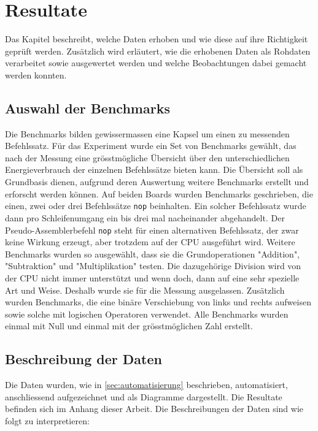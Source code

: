 \chapter{Resultate}

Das Kapitel beschreibt, welche Daten erhoben und wie diese auf ihre Richtigkeit geprüft werden. Zusätzlich wird erläutert, wie die erhobenen Daten als Rohdaten verarbeitet sowie ausgewertet werden und welche Beobachtungen dabei gemacht werden konnten.


\section{Auswahl der Benchmarks}

Die Benchmarks bilden gewissermassen eine Kapsel um einen zu messenden Befehlssatz. Für das Experiment wurde ein Set von Benchmarks gewählt, das nach der Messung eine grösstmögliche Übersicht über den unterschiedlichen Energieverbrauch der einzelnen Befehlssätze bieten kann. Die Übersicht soll als Grundbasis dienen, aufgrund deren Auswertung weitere Benchmarks erstellt und erforscht werden können. Auf beiden Boards wurden Benchmarks geschrieben, die einen, zwei oder drei Befehlssätze \texttt{nop} beinhalten. Ein solcher Befehlssatz wurde dann pro Schleifenumgang ein bis drei mal nacheinander abgehandelt. Der Pseudo-Assemblerbefehl \texttt{nop} steht für einen alternativen Befehlssatz, der zwar keine Wirkung erzeugt, aber trotzdem auf der CPU ausgeführt wird. Weitere Benchmarks wurden so ausgewählt, dass sie die Grundoperationen "Addition", "Subtraktion" und "Multiplikation" testen. Die dazugehörige Division wird von der CPU nicht immer unterstützt und wenn doch, dann auf eine sehr spezielle Art und Weise. Deshalb wurde sie für die Messung ausgelassen. Zusätzlich wurden Benchmarks, die eine binäre Verschiebung von links und rechts aufweisen sowie solche mit logischen Operatoren verwendet. Alle Benchmarks wurden einmal mit Null und einmal mit der grösstmöglichen Zahl erstellt.




\section{Beschreibung der Daten}

Die Daten wurden, wie in \autoref{sec:automatisierung} beschrieben, automatisiert, anschliessend aufgezeichnet und als Diagramme dargestellt. Die Resultate befinden sich im Anhang dieser Arbeit. Die Beschreibungen der Daten sind wie folgt zu interpretieren:

